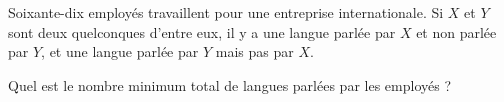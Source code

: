 Soixante-dix employés travaillent pour une entreprise internationale. Si $X$ et $Y$ sont deux quelconques d’entre eux, il y a une langue parlée par $X$ et non parlée par $Y$, et une langue parlée par $Y$ mais pas par $X$.

Quel est le nombre minimum total de langues parlées par les employés ?